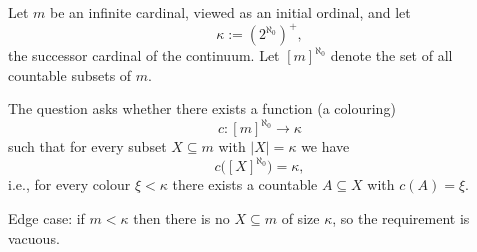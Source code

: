 \par
Let $m$ be an infinite cardinal, viewed as an initial ordinal, and let
\[
\kappa := (2^{\aleph_0})^+,
\]
the successor cardinal of the continuum.
Let $[m]^{\aleph_0}$ denote the set of all countable subsets of $m$.

The question asks whether there exists a function (a colouring)
\[
c : [m]^{\aleph_0} \to \kappa
\]
such that for every subset $X\subseteq m$ with $|X|=\kappa$ we have
\[
 c\big([X]^{\aleph_0}\big) = \kappa,
\]
i.e., for every colour $\xi<\kappa$ there exists a countable $A\subseteq X$ with $c(A)=\xi$.

Edge case: if $m<\kappa$ then there is no $X\subseteq m$ of size $\kappa$, so the requirement is vacuous.
